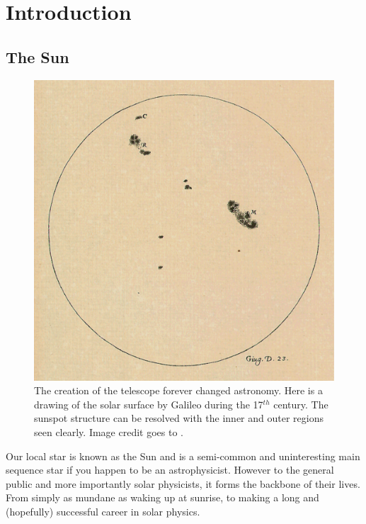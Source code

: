 \graphicspath{{Chapter1/Figs/}}

\chapter{Introduction}
      	
   \vspace*{\fill}\par
   \pagebreak

\section{The Sun}

    \begin{figure}
        \centering
        \includegraphics[width=\textwidth]{23_June_1613.pdf}
        \caption{
                 The creation of the telescope forever changed astronomy.
                 Here is a drawing of the solar surface by Galileo during the 17$^{{th}}$ century. 
                 The sunspot structure can be resolved with the inner and outer regions seen clearly.
                 Image credit goes to \cite{galileo}.
               }
        \label{fig:galileo}
    \end{figure}
     
    Our local star is known as the Sun and is a semi-common and uninteresting main sequence star if you happen to be an astrophysicist.
    However to the general public and more importantly solar physicists, it forms the backbone of their lives.
    From simply as mundane as waking up at sunrise, to making a long and (hopefully) successful career in solar physics.
    
